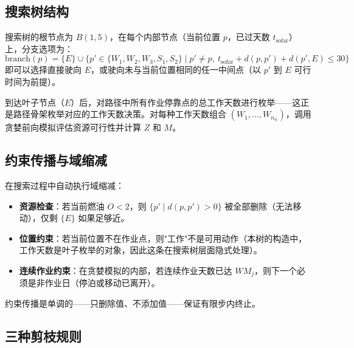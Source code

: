 \documentclass[12pt,a4paper]{ctexart}
\theoremstyle{definition}
\begin{document}
\subsection{搜索树结构}

搜索树的根节点为 $B(1,5)$，在每个内部节点（当前位置 $p$，已过天数 $t_{\text{sofar}}$）上，分支选项为：
\begin{equation}
  \text{branch}(p) = \{E\} \cup \{p'\in\{W_1,W_2,W_3,S_1,S_2\}\mid p'\neq p,\ t_{\text{sofar}}+d(p,p')+d(p',E)\le 30\}
\end{equation}
即可以选择直接驶向 $E$，或驶向未与当前位置相同的任一中间点（以 $p'$ 到 $E$ 可行时间为前提）。

到达叶子节点（$E$）后，对路径中所有作业停靠点的总工作天数进行枚举——这正是路径骨架枚举对应的工作天数决策。对每种工作天数组合 $(W_1,\dots,W_{n_w})$，调用贪婪前向模拟评估资源可行性并计算 $Z$ 和 $M$。

\subsection{约束传播与域缩减}

在搜索过程中自动执行域缩减：

\begin{itemize}
  \item \textbf{资源检查}：若当前燃油 $O<2$，则 $\{p'\mid d(p,p')>0\}$ 被全部删除（无法移动），仅剩 $\{E\}$ 如果足够近。
  \item \textbf{位置约束}：若当前位置不在作业点，则"工作"不是可用动作（本树的构造中，工作天数是叶子枚举的对象，因此这条在搜索树层面隐式处理）。
  \item \textbf{连续作业约束}：在贪婪模拟的内部，若连续作业天数已达 $WM_j$，则下一个必须是非作业日（停泊或移动已离开）。
\end{itemize}

约束传播是单调的——只删除值、不添加值——保证有限步内终止。

\subsection{三种剪枝规则}
\end{document}
